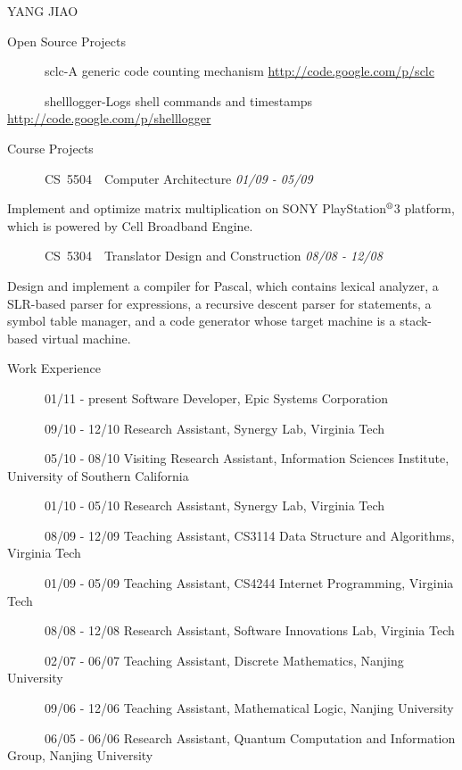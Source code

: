 \documentclass{article}
\newcommand{\up}[1]{\ensuremath{^\textrm{\scriptsize#1}}}
\begin{document}
\begin{cv}{YANG JIAO}
\begin{cvlist}{Open Source Projects}
\item [~~~~~~sclc-A generic code counting mechanism] \hfill {\url{http://code.google.com/p/sclc}}
\item [~~~~~~shelllogger-Logs shell commands and timestamps] \hfill {\url{http://code.google.com/p/shelllogger}}
\end{cvlist}

\begin{cvlist}{Course Projects}
\item [~~~~~~CS~5504~~Computer Architecture] \hfill {\it 01/09 - 05/09}
\item Implement and optimize matrix multiplication on SONY PlayStation\up{\textregistered}3 platform, which is powered by Cell Broadband Engine.
\item [~~~~~~CS~5304~~Translator Design and Construction] \hfill {\it 08/08 - 12/08}
\item Design and implement a compiler for Pascal, which contains lexical analyzer, a SLR-based parser for expressions, a recursive descent parser for statements, a symbol table manager, and a code generator whose target machine is a stack-based virtual machine.
\end{cvlist}

\begin{cvlist}{Work Experience}
\item [~~~~~~01/11 - present] Software Developer, Epic Systems Corporation
\item [~~~~~~09/10 - 12/10] Research Assistant, Synergy Lab, Virginia Tech
\item [~~~~~~05/10 - 08/10] Visiting Research Assistant, Information Sciences Institute, University of Southern California
\item [~~~~~~01/10 - 05/10] Research Assistant, Synergy Lab, Virginia Tech
\item [~~~~~~08/09 - 12/09] Teaching Assistant, CS3114 Data Structure and Algorithms, Virginia Tech
\item [~~~~~~01/09 - 05/09] Teaching Assistant, CS4244 Internet Programming, Virginia Tech
\item [~~~~~~08/08 - 12/08] Research Assistant, Software Innovations Lab, Virginia Tech
\item [~~~~~~02/07 - 06/07] Teaching Assistant, Discrete Mathematics, Nanjing University
\item [~~~~~~09/06 - 12/06] Teaching Assistant, Mathematical Logic, Nanjing University
\item [~~~~~~06/05 - 06/06] Research Assistant, Quantum Computation and Information Group, Nanjing University
\end{cvlist}



\end{cv}
\end{document}
